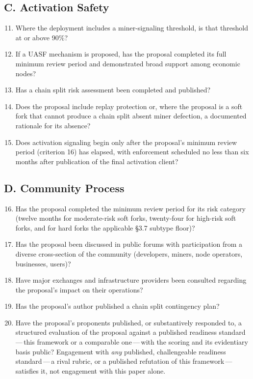 \documentclass[11pt, twoside, openright]{book}
\newcommand{\sect}[1]{\S#1}
\begin{document}
\subsection*{C. Activation Safety}
\begin{enumerate}\setcounter{enumi}{10}
  \item Where the deployment includes a miner-signaling threshold, is that threshold at or above 90\%?
  \item If a UASF mechanism is proposed, has the proposal completed its full minimum review period and demonstrated broad support among economic nodes?
  \item Has a chain split risk assessment been completed and published?
  \item Does the proposal include replay protection or, where the proposal is a soft fork that cannot produce a chain split absent miner defection, a documented rationale for its absence?
  \item Does activation signaling begin only after the proposal's minimum review period (criterion 16) has elapsed, with enforcement scheduled no less than six months after publication of the final activation client?
\end{enumerate}

\subsection*{D. Community Process}
\begin{enumerate}\setcounter{enumi}{15}
  \item Has the proposal completed the minimum review period for its risk category (twelve months for moderate-risk soft forks, twenty-four for high-risk soft forks, and for hard forks the applicable \sect{3.7} subtype floor)?
  \item Has the proposal been discussed in public forums with participation from a diverse cross-section of the community (developers, miners, node operators, businesses, users)?
  \item Have major exchanges and infrastructure providers been consulted regarding the proposal's impact on their operations?
  \item Has the proposal's author published a chain split contingency plan?
  \item Have the proposal's proponents published, or substantively responded to, a structured evaluation of the proposal against a published readiness standard\,---\,this framework or a comparable one\,---\,with the scoring and its evidentiary basis public? Engagement with \textit{any} published, challengeable readiness standard\,---\,a rival rubric, or a published refutation of this framework\,---\,satisfies it, not engagement with this paper alone.
\end{enumerate}
\end{document}
